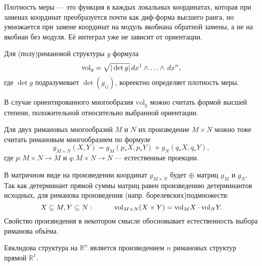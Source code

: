\begin{to_def}
	Плотность меры --- это функция в каждых локальных координатах, которая при заменах координат преобразуется почти как диф-форма высшего ранга, но умножается при замене координат на модуль якобиана обратной замены, а не на якобиан без модуля. Её интеграл уже не зависит от ориентации.
\end{to_def}

\begin{to_lem}
	Для (полу)римановой структуры $g$ формула
	\begin{equation*}
		\text{vol}_g = \sqrt{|\det g|} \, d x^1 \wedge \ldots \wedge \, d x^n,
	\end{equation*}
	где $\det g$ подразумевает $\det (g_{i j})$, кореектно определяет плотность меры.
\end{to_lem}

В случае ориентированного многообразия $\text{vol}_{g}$ можно считать формой высшей степени, положительной  относительно выбранной ориентации.

Для двух римановых многообразий $M$ и $N$ их произведение $M \times N$ можно  тоже считать римановым многообразием по формуле
\begin{equation*}
	g_{M \times N}(X,Y) = g_{M}(p_*X, p_*Y) + g_{N}(q_*X, q_*Y),
\end{equation*}
где $p \colon M \times N \rightarrow M$ и $q \colon M \times N \rightarrow N$ --- естественные проекции.

В матричном виде на произведении координат $g_{M\times N}$ будет $\oplus$ матриц $g_M $ и $g_N$. Так как детерминант прямой суммы матриц равен произведению детерминантов исходных, для риманова произведения (напр. борелевских)подмножеств:
\begin{equation*}
	X \subseteq M, Y \subseteq N:
	\hspace*{1 cm}
	\text{vol}_{M \times N} (X \times Y) = \text{vol}_M X \cdot  \text{vol}_N Y.
\end{equation*}
Свойство произведения в некотором смысле обосновывает естественность выбора риманова объёма.

\begin{to_tas}
	Евклидова структура на $\mathbb{R}^n$ является произведением $n$ римановых структур прямой $\mathbb{R}^1$.
\end{to_tas}
